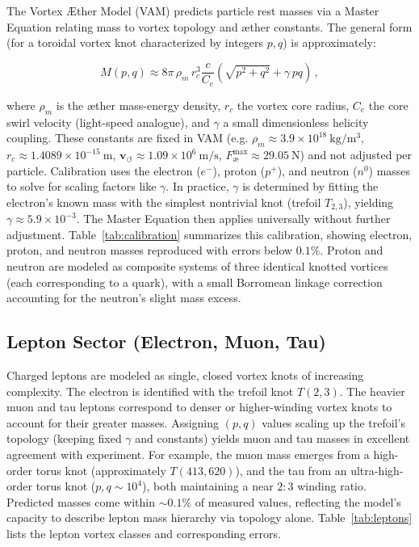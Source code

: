 \documentclass[11pt]{article}
\begin{document}
The Vortex Æther Model (VAM) predicts particle rest masses via a Master Equation relating mass to vortex topology and æther constants. The general form (for a toroidal vortex knot characterized by integers $p,q$) is approximately:

\[
    M(p,q) \approx 8\pi \,\rho_{\scriptscriptstyle\boldsymbol\!m} \, r_c^3 \frac{c}{C_e} \left( \sqrt{p^2 + q^2} + \gamma \, p q \right) \,,
\]

where $\rho_{\scriptscriptstyle\boldsymbol\!m}$ is the æther mass-energy density, $r_c$ the vortex core radius, $C_e$ the core swirl velocity (light-speed analogue), and $\gamma$ a small dimensionless helicity coupling. These constants are fixed in VAM (e.g. $\rho_{\scriptscriptstyle\boldsymbol\!m} \approx 3.9 \times 10^{18}~\mathrm{kg/m^3}$, $r_c \approx 1.4089 \times 10^{-15}~\mathrm{m}$, $\mathbf{v}_{\scriptscriptstyle\boldsymbol{\circlearrowleft}} \approx 1.09 \times 10^6~\mathrm{m/s}$, $F^{\max}_{\text{\ae}} \approx 29.05~\mathrm{N}$) and not adjusted per particle. Calibration uses the electron ($e^-$), proton ($p^+$), and neutron ($n^0$) masses to solve for scaling factors like $\gamma$. In practice, $\gamma$ is determined by fitting the electron’s known mass with the simplest nontrivial knot (trefoil $T_{2,3}$), yielding $\gamma \approx 5.9 \times 10^{-3}$. The Master Equation then applies universally without further adjustment. Table~\ref{tab:calibration} summarizes this calibration, showing electron, proton, and neutron masses reproduced with errors below $0.1\%$. Proton and neutron are modeled as composite systems of three identical knotted vortices (each corresponding to a quark), with a small Borromean linkage correction accounting for the neutron’s slight mass excess.

\subsection{Lepton Sector (Electron, Muon, Tau)}

Charged leptons are modeled as single, closed vortex knots of increasing complexity. The electron is identified with the trefoil knot $T(2,3)$. The heavier muon and tau leptons correspond to denser or higher-winding vortex knots to account for their greater masses. Assigning $(p,q)$ values scaling up the trefoil’s topology (keeping fixed $\gamma$ and constants) yields muon and tau masses in excellent agreement with experiment. For example, the muon mass emerges from a high-order torus knot (approximately $T(413,620)$), and the tau from an ultra-high-order torus knot ($p,q \sim 10^4$), both maintaining a near $2:3$ winding ratio. Predicted masses come within $\sim 0.1\%$ of measured values, reflecting the model’s capacity to describe lepton mass hierarchy via topology alone. Table~\ref{tab:leptons} lists the lepton vortex classes and corresponding errors.
\end{document}
